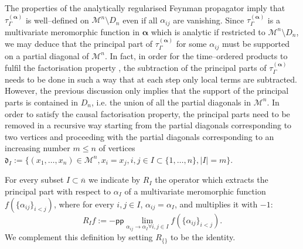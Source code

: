 \documentclass[10pt]{book}
\newcommand{\pp}{\mathsf{pp}}
\newcommand{\Mcal}{\mathcal{M}}
\theoremstyle{break}
\begin{document}
The properties of the analytically regularised Feynman propagator imply that $\tau^{(\boldsymbol{\alpha})}_\Gamma$ is well--defined on $ \Mcal^n \setminus D_n $ %
even if all $\alpha_{ij}$ are vanishing. Since $\tau^{(\boldsymbol{\alpha})}_\Gamma$ is a multivariate meromorphic function in $\boldsymbol{\alpha}$  which is analytic if restricted to $\Mcal^n\setminus D_n$, we may deduce that the principal part of $\tau^{(\boldsymbol{\alpha})}_\Gamma$ for some $\alpha_{ij}$ must be supported on a partial diagonal of $\Mcal^n$. In fact, in order for the time--ordered products to fulfil the factorisation property %
, the subtraction of the principal parts of $\tau^{(\boldsymbol{\alpha})}_\Gamma$ needs to be done in such a way that at each step only local terms are subtracted. However, the previous discussion only implies that the support of the principal parts is contained in $D_n$, i.e. the union of all the partial diagonals in $\Mcal^n$. In order to satisfy the causal factorisation property, the principal parts need to be removed in 
a recursive way starting from the partial diagonals corresponding to two vertices and proceeding with the partial diagonals corresponding to an increasing number $m\le n$ of vertices $\mathfrak{d}_{I}:=\{ (x_1,\dots, x_n) \in \Mcal^n, x_i=x_j, i,j \in I\subset \{1,\dots, n\} , |I|=m\}$.


For every subset $I\subset \overline{n}$ we indicate by $R_I$ the operator which extracts the principal part with respect to $\alpha_I$ of a multivariate meromorphic function $f(\{\alpha_{ij}\}_{i<j})$, where for every $i,j \in I$, $\alpha_{ij}=\alpha_I$, and multiplies it with $-1$:
\begin{equation*}
R_I f := - \pp  \lim_{\scriptstyle\alpha_{ij} \to \alpha_I \forall i,j\in I} f(\{\alpha_{ij}\}_{i<j}).
\end{equation*}
We complement this definition by setting $R_{\{\}}$ to be the identity.
\end{document}

